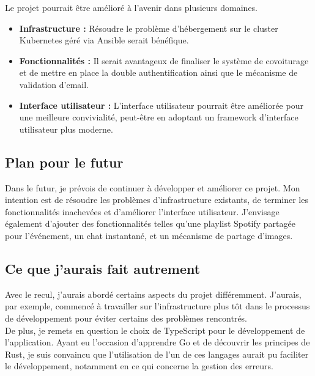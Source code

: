 Le projet pourrait être amélioré à l'avenir dans plusieurs domaines.\\

\begin{itemize}
    \item \textbf{Infrastructure :} Résoudre le problème d'hébergement sur le cluster Kubernetes géré via Ansible serait bénéfique.
    \item \textbf{Fonctionnalités :} Il serait avantageux de finaliser le système de covoiturage et de mettre en place la double authentification ainsi que le mécanisme de validation d'email.
    \item \textbf{Interface utilisateur :} L'interface utilisateur pourrait être améliorée pour une meilleure convivialité, peut-être en adoptant un framework d'interface utilisateur plus moderne.
\end{itemize}

\subsection{Plan pour le futur}\label{subsec:plan-futur}

Dans le futur, je prévois de continuer à développer et améliorer ce projet.
Mon intention est de résoudre les problèmes d'infrastructure existants, de terminer les fonctionnalités inachevées et d'améliorer l'interface utilisateur.
J'envisage également d'ajouter des fonctionnalités telles qu'une playlist Spotify partagée pour l'événement, un chat instantané, et un mécanisme de partage d'images.

\subsection{Ce que j'aurais fait autrement}\label{subsec:ce-que-j-aurais-fait-autrement}

Avec le recul, j'aurais abordé certains aspects du projet différemment.
J'aurais, par exemple, commencé à travailler sur l'infrastructure plus tôt dans le processus de développement pour éviter certains des problèmes rencontrés.\\

De plus, je remets en question le choix de TypeScript pour le développement de l'application.
Ayant eu l'occasion d'apprendre Go et de découvrir les principes de Rust, je suis convaincu que l'utilisation de l'un de ces langages aurait pu faciliter le développement,
notamment en ce qui concerne la gestion des erreurs.\\

